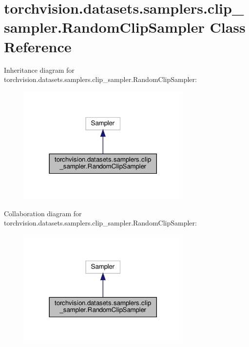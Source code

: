 \hypertarget{classtorchvision_1_1datasets_1_1samplers_1_1clip__sampler_1_1RandomClipSampler}{}\section{torchvision.\+datasets.\+samplers.\+clip\+\_\+sampler.\+Random\+Clip\+Sampler Class Reference}
\label{classtorchvision_1_1datasets_1_1samplers_1_1clip__sampler_1_1RandomClipSampler}


Inheritance diagram for torchvision.\+datasets.\+samplers.\+clip\+\_\+sampler.\+Random\+Clip\+Sampler\+:
\nopagebreak
\begin{figure}[H]
\begin{center}
\leavevmode
\includegraphics[width=245pt]{classtorchvision_1_1datasets_1_1samplers_1_1clip__sampler_1_1RandomClipSampler__inherit__graph}
\end{center}
\end{figure}


Collaboration diagram for torchvision.\+datasets.\+samplers.\+clip\+\_\+sampler.\+Random\+Clip\+Sampler\+:
\nopagebreak
\begin{figure}[H]
\begin{center}
\leavevmode
\includegraphics[width=245pt]{classtorchvision_1_1datasets_1_1samplers_1_1clip__sampler_1_1RandomClipSampler__coll__graph}
\end{center}
\end{figure}
